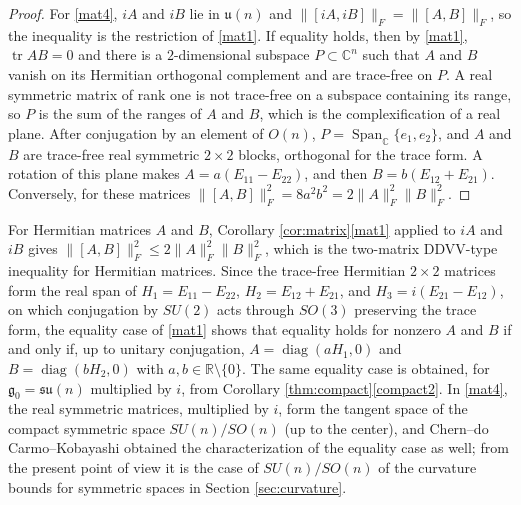 \documentclass [leqno, 10pt]{amsart}
\theoremstyle{definition}
\numberwithin{equation}{section}
\newcommand{\spn}{\operatorname{Span}}
\newcommand{\su}{\mathfrak{su}}
\newcommand{\g}{\mathfrak{g}}
\newcommand{\rea}{\mathbb R}
\newcommand{\com}{\mathbb C}
\newcommand{\tr}{\operatorname{tr}}
\newcommand{\gz}{\g_{0}}
\newcommand{\fnorm}[1]{\lVert #1\rVert_{F}}
\begin{document}
\begin{proof}
For \ref{mat4}, $iA$ and $iB$ lie in $\mathfrak{u}(n)$ and $\fnorm{[iA, iB]} = \fnorm{[A, B]}$, so the inequality is the restriction of \ref{mat1}. If equality holds, then by \ref{mat1}, $\tr AB = 0$ and there is a $2$-dimensional subspace $P \subset \com^{n}$ such that $A$ and $B$ vanish on its Hermitian orthogonal complement and are trace-free on $P$. A real symmetric matrix of rank one is not trace-free on a subspace containing its range, so $P$ is the sum of the ranges of $A$ and $B$, which is the complexification of a real plane. After conjugation by an element of $O(n)$, $P = \spn_{\com}\{e_{1}, e_{2}\}$, and $A$ and $B$ are trace-free real symmetric $2 \times 2$ blocks, orthogonal for the trace form. A rotation of this plane makes $A = a(E_{11} - E_{22})$, and then $B = b(E_{12} + E_{21})$. Conversely, for these matrices $\fnorm{[A, B]}^{2} = 8a^{2}b^{2} = 2\fnorm{A}^{2}\fnorm{B}^{2}$.
\end{proof}

For Hermitian matrices $A$ and $B$, Corollary \ref{cor:matrix}\ref{mat1} applied to $iA$ and $iB$ gives $\fnorm{[A, B]}^{2} \leq 2\fnorm{A}^{2}\fnorm{B}^{2}$, which is the two-matrix DDVV-type inequality for Hermitian matrices. Since the trace-free Hermitian $2 \times 2$ matrices form the real span of $H_{1} = E_{11} - E_{22}$, $H_{2} = E_{12} + E_{21}$, and $H_{3} = i(E_{21} - E_{12})$, on which conjugation by $SU(2)$ acts through $SO(3)$ preserving the trace form, the equality case of \ref{mat1} shows that equality holds for nonzero $A$ and $B$ if and only if, up to unitary conjugation, $A = \operatorname{diag}(aH_{1}, 0)$ and $B = \operatorname{diag}(bH_{2}, 0)$ with $a, b \in \rea \setminus \{0\}$. The same equality case is obtained, for $\gz = \su(n)$ multiplied by $i$, from Corollary \ref{thm:compact}\ref{compact2}.
In \ref{mat4}, the real symmetric matrices, multiplied by $i$, form the tangent space of the compact symmetric space $SU(n)/SO(n)$ (up to the center), and Chern--do Carmo--Kobayashi obtained the characterization of the equality case as well; from the present point of view it is the case of $SU(n)/SO(n)$ of the curvature bounds for symmetric spaces in Section \ref{sec:curvature}.
\end{document}
